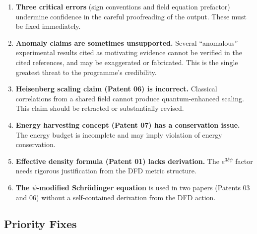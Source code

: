 \documentclass[12pt,a4paper]{article}
\begin{document}
\begin{enumerate}[nosep]
\item \textbf{Three critical errors} (sign conventions and field equation
prefactor) undermine confidence in the careful proofreading of the output.
These must be fixed immediately.

\item \textbf{Anomaly claims are sometimes unsupported.} Several
``anomalous'' experimental results cited as motivating evidence cannot
be verified in the cited references, and may be exaggerated or fabricated.
This is the single greatest threat to the programme's credibility.

\item \textbf{Heisenberg scaling claim (Patent 06) is incorrect.}
Classical correlations from a shared field cannot produce quantum-enhanced
scaling. This claim should be retracted or substantially revised.

\item \textbf{Energy harvesting concept (Patent 07) has a conservation
issue.} The energy budget is incomplete and may imply violation of
energy conservation.

\item \textbf{Effective density formula (Patent 01) lacks derivation.}
The $e^{3\delta\psi}$ factor needs rigorous justification from the DFD
metric structure.

\item \textbf{The $\psi$-modified Schr\"{o}dinger equation} is used
in two papers (Patents 03 and 06) without a self-contained derivation
from the DFD action.
\end{enumerate}

\subsection{Priority Fixes}
\end{document}
